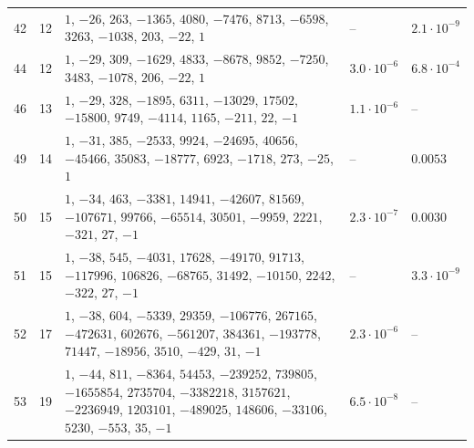 \documentclass[11pt]{amsart}
\theoremstyle{remark}
\numberwithin{equation}{section}
\begin{document}
\begin{table}[p]
\begin{tabular}{@{}rr>{\raggedright\arraybackslash}p{}ll@{}}
42 & 12 & $1$, $-26$, $263$, $-1365$, $4080$, $-7476$, $8713$, $-6598$, $3263$, $-1038$, $203$, $-22$, $1$ & -- & $2.1\cdot10^{-9}$\\
44 & 12 & $1$, $-29$, $309$, $-1629$, $4833$, $-8678$, $9852$, $-7250$, $3483$, $-1078$, $206$, $-22$, $1$ & $3.0\cdot10^{-6}$ & $6.8\cdot10^{-4}$\\
46 & 13 & $1$, $-29$, $328$, $-1895$, $6311$, $-13029$, $17502$, $-15800$, $9749$, $-4114$, $1165$, $-211$, $22$, $-1$ & $1.1\cdot10^{-6}$ & --\\
49 & 14 & $1$, $-31$, $385$, $-2533$, $9924$, $-24695$, $40656$, $-45466$, $35083$, $-18777$, $6923$, $-1718$, $273$, $-25$, $1$ & -- & $0.0053$\\
50 & 15 & $1$, $-34$, $463$, $-3381$, $14941$, $-42607$, $81569$, $-107671$, $99766$, $-65514$, $30501$, $-9959$, $2221$, $-321$, $27$, $-1$ & $2.3\cdot10^{-7}$ & $0.0030$\\
51 & 15 & $1$, $-38$, $545$, $-4031$, $17628$, $-49170$, $91713$, $-117996$, $106826$, $-68765$, $31492$, $-10150$, $2242$, $-322$, $27$, $-1$ & -- & $3.3\cdot10^{-9}$\\
52 & 17 & $1$, $-38$, $604$, $-5339$, $29359$, $-106776$, $267165$, $-472631$, $602676$, $-561207$, $384361$, $-193778$, $71447$, $-18956$, $3510$, $-429$, $31$, $-1$ & $2.3\cdot10^{-6}$ & --\\
53 & 19 & $1$, $-44$, $811$, $-8364$, $54453$, $-239252$, $739805$, $-1655854$, $2735704$, $-3382218$, $3157621$, $-2236949$, $1203101$, $-489025$, $148606$, $-33106$, $5230$, $-553$, $35$, $-1$ & $6.5\cdot10^{-8}$ & --\\
\bottomrule
\end{tabular}
\end{table}
\end{document}
